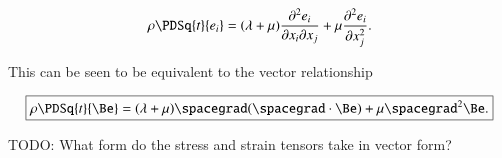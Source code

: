 \begin{equation}\label{eqn:continuumL6:270}
\rho \PDSq{t}{e_i} = (\lambda + \mu) \frac{\partial^2 e_i}{\partial x_i \partial x_j}
+ \mu
\frac{\partial^2 e_i}
{\partial x_j^2
}.
\end{equation}

This can be seen to be equivalent to the vector relationship

\begin{equation}\label{eqn:continuumL6:290}
\boxed{
\rho \PDSq{t}{\Be} = (\lambda + \mu) \spacegrad (\spacegrad \cdot \Be) + \mu \spacegrad^2 \Be.
}
\end{equation}

TODO: What form do the stress and strain tensors take in vector form?

\EndArticle

